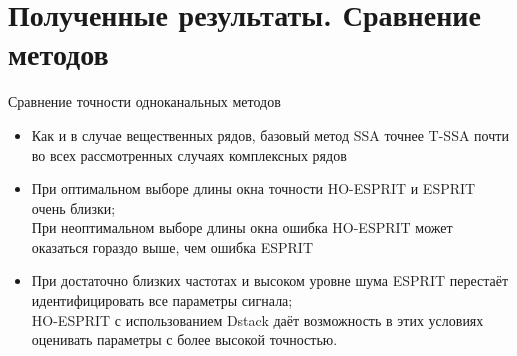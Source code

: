 \documentclass[pdf, unicode, 10pt, notheorems, handout]{beamer}
\newtheorem{theorem}{Теорема}
\begin{document}

\section{Полученные результаты. Сравнение методов}
\begin{frame}{Сравнение точности одноканальных методов}
  \begin{itemize}
    \item Как и в случае вещественных рядов, базовый метод SSA точнее
      T-SSA почти во всех рассмотренных случаях комплексных рядов\smallskip
    \item При оптимальном выборе длины окна точности HO-ESPRIT и
      ESPRIT очень близки;\\
      При неоптимальном выборе длины окна ошибка HO-ESPRIT может
      оказаться гораздо выше, чем ошибка ESPRIT \smallskip
    \item При достаточно близких частотах и высоком уровне шума
      ESPRIT перестаёт идентифицировать все параметры сигнала;\\
      HO-ESPRIT с использованием Dstack даёт возможность в этих
      условиях оценивать параметры с более высокой точностью.
  \end{itemize}
\end{frame}
\end{document}
